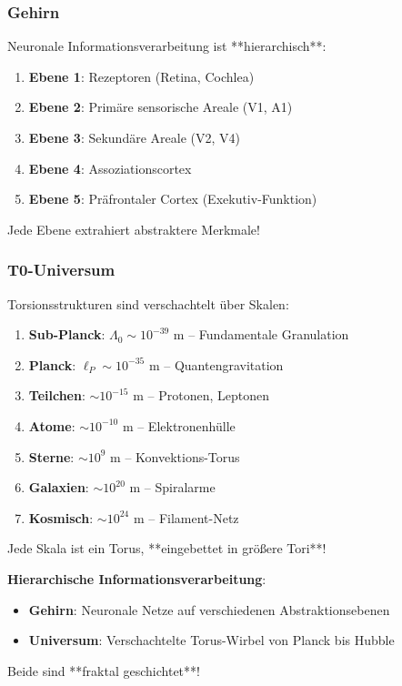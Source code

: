 	\subsubsection{Gehirn}
	
	Neuronale Informationsverarbeitung ist **hierarchisch**:
	
	\begin{enumerate}
		\item \textbf{Ebene 1}: Rezeptoren (Retina, Cochlea)
		\item \textbf{Ebene 2}: Primäre sensorische Areale (V1, A1)
		\item \textbf{Ebene 3}: Sekundäre Areale (V2, V4)
		\item \textbf{Ebene 4}: Assoziationscortex
		\item \textbf{Ebene 5}: Präfrontaler Cortex (Exekutiv-Funktion)
	\end{enumerate}
	
	Jede Ebene extrahiert abstraktere Merkmale!
	
	\subsubsection{T0-Universum}
	
	Torsionsstrukturen sind verschachtelt über Skalen:
	
	\begin{enumerate}
		\item \textbf{Sub-Planck}: $\Lambda_0 \sim 10^{-39}$ m -- Fundamentale Granulation
		\item \textbf{Planck}: $\ell_P \sim 10^{-35}$ m -- Quantengravitation
		\item \textbf{Teilchen}: $\sim 10^{-15}$ m -- Protonen, Leptonen
		\item \textbf{Atome}: $\sim 10^{-10}$ m -- Elektronenhülle
		\item \textbf{Sterne}: $\sim 10^9$ m -- Konvektions-Torus
		\item \textbf{Galaxien}: $\sim 10^{20}$ m -- Spiralarme
		\item \textbf{Kosmisch}: $\sim 10^{24}$ m -- Filament-Netz
	\end{enumerate}
	
	Jede Skala ist ein Torus, **eingebettet in größere Tori**!
	
	\begin{keyresult}
		\textbf{Hierarchische Informationsverarbeitung}:
		
		\begin{itemize}
			\item \textbf{Gehirn}: Neuronale Netze auf verschiedenen Abstraktionsebenen
			\item \textbf{Universum}: Verschachtelte Torus-Wirbel von Planck bis Hubble
		\end{itemize}
		
		Beide sind **fraktal geschichtet**!
	\end{keyresult}
	
